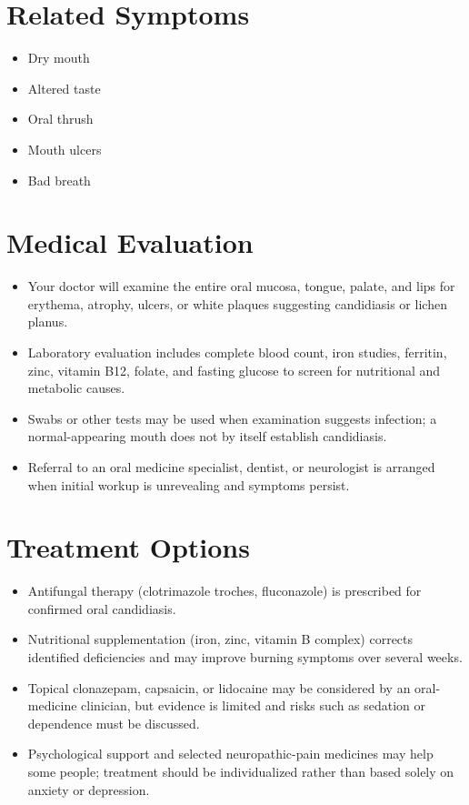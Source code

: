 \section*{Related Symptoms}
\begin{itemize}
 \item Dry mouth
 \item Altered taste
 \item Oral thrush
 \item Mouth ulcers
 \item Bad breath
\end{itemize}


\section*{Medical Evaluation}
\begin{itemize}
 \item Your doctor will examine the entire oral mucosa, tongue, palate, and lips for erythema, atrophy, ulcers, or white plaques suggesting candidiasis or lichen planus.
 \item Laboratory evaluation includes complete blood count, iron studies, ferritin, zinc, vitamin B12, folate, and fasting glucose to screen for nutritional and metabolic causes.
 \item Swabs or other tests may be used when examination suggests infection; a normal-appearing mouth does not by itself establish candidiasis.
 \item Referral to an oral medicine specialist, dentist, or neurologist is arranged when initial workup is unrevealing and symptoms persist.
\end{itemize}

\section*{Treatment Options}
\begin{itemize}
 \item Antifungal therapy (clotrimazole troches, fluconazole) is prescribed for confirmed oral candidiasis.
 \item Nutritional supplementation (iron, zinc, vitamin B complex) corrects identified deficiencies and may improve burning symptoms over several weeks.
 \item Topical clonazepam, capsaicin, or lidocaine may be considered by an oral-medicine clinician, but evidence is limited and risks such as sedation or dependence must be discussed.
 \item Psychological support and selected neuropathic-pain medicines may help some people; treatment should be individualized rather than based solely on anxiety or depression.
\end{itemize}

